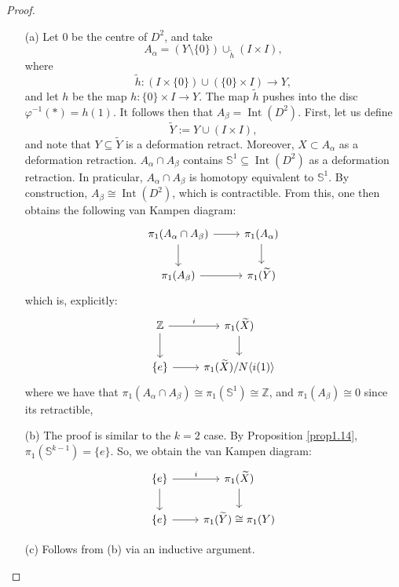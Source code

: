 \documentclass[a4paper]{report}
\theoremstyle{definition}
\theoremstyle{remark}
\theoremstyle{proposition}
\theoremstyle{conjecture}
\theoremstyle{lemma}
\theoremstyle{corollary}
\theoremstyle{exercise}
\newcommand{\on}{\operatorname}
\begin{document}
\begin{proof}
    \leavevmode
    \begin{itemize}
        \item[(a)] Let $0$ be the centre of $D^2$, and take 
            $$A_\alpha = (Y \setminus \lbrace 0 \rbrace) \cup_{\widetilde{h}} (I\times I),$$
            where $$\widetilde{h} : (I \times \lbrace 0 \rbrace) \cup (\lbrace 0 \rbrace \times I) \longrightarrow Y,$$
            and let $h$ be the map 
            $h : \lbrace 0 \rbrace \times I \to Y$.
            The map $\widetilde{h}$ pushes into the disc $\varphi^{-1}(\ast) = h(1)$.
            It follows then that $A_\beta = \on{Int}(D^2)$.
            First, let us define $$\widetilde{Y} := Y \cup (I \times I),$$
            and note that $Y \subseteq \widetilde{Y}$ is a deformation retract.
            Moreover, $X\subset A_\alpha$ as a deformation retraction.
            $A_\alpha \cap A_\beta$ contains $\mathbb{S}^1 \subseteq \on{Int}(D^2)$
            as a deformation retraction. In praticular, $A_\alpha \cap A_\beta$ is 
            homotopy equivalent to $\mathbb{S}^1$. By construction,
            $A_\beta \cong \on{Int}(D^2)$, which is contractible.
            From this, one then obtains the following van Kampen diagram:
            $$\begin{tikzcd}
\pi_1(A_\alpha \cap A_\beta) \arrow[r] \arrow[d] & \pi_1(A_\alpha) \arrow[d] \\
\pi_1(A_\beta) \arrow[r]                         & \pi_1(\widetilde{Y})     
\end{tikzcd}$$
            which is, explicitly:
            $$\begin{tikzcd}
                \mathbb{Z} \arrow[r, "i"] \arrow[d] & \pi_1(\widetilde{X}) \arrow[d]          \\
                \lbrace e \rbrace \arrow[r]                         & \pi_1(\widetilde{X})/N\langle i(1)\rangle
            \end{tikzcd}$$
            where we have that $\pi_1(A_\alpha \cap A_\beta) \cong \pi_1(\mathbb{S}^1)\cong \mathbb{Z}$,
            and $\pi_1(A_\beta) \cong 0$ since its retractible,
    \item[(b)] The proof is similar to the $k=2$ case.
        By Proposition \ref{prop1.14}, $\pi_1(\mathbb{S}^{k-1}) = \lbrace e\rbrace$.
        So, we obtain the van Kampen diagram:
        $$\begin{tikzcd}
    \lbrace e\rbrace \arrow[r, "i"] \arrow[d] & \pi_1(\widetilde{X}) \arrow[d]      \\
    \lbrace e \rbrace \arrow[r]               & \pi_1(\widetilde{Y}) \cong \pi_1(Y)
\end{tikzcd}$$
    \item[(c)] Follows from (b) via an inductive argument.
\end{itemize}
\end{proof}
\end{document}
